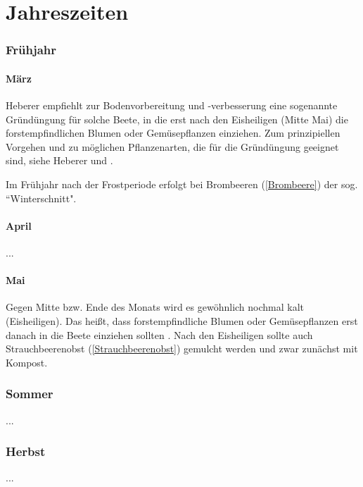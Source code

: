 \part{Jahreszeiten}

\section{Frühjahr}

\subsection{März}
\label{Mai}
Heberer \cite[S.~11]{Heberer2018} empfiehlt zur Bodenvorbereitung und -verbesserung eine sogenannte Gründüngung für solche Beete, in die erst nach den Eisheiligen (Mitte Mai) die forstempfindlichen Blumen oder Gemüsepflanzen einziehen.
Zum prinzipiellen Vorgehen und zu möglichen Pflanzenarten, die für die Gründüngung geeignet sind, siehe Heberer \cite[S.~11]{Heberer2018} und \cite[S.~114f]{Heberer2018}.

Im Frühjahr nach der Frostperiode erfolgt bei Brombeeren (\ref{Brombeere}) der sog. ``Winterschnitt".

\subsection{April}

...

\subsection{Mai}

Gegen Mitte bzw. Ende des Monats wird es gewöhnlich nochmal kalt (Eisheiligen).
Das heißt, dass forstempfindliche Blumen oder Gemüsepflanzen erst danach in die Beete einziehen sollten \cite[S.~11]{Heberer2018}.
Nach den Eisheiligen sollte auch \textrightarrow Strauchbeerenobst (\ref{Strauchbeerenobst}) gemulcht werden und zwar zunächst mit Kompost.

\section{Sommer}

...

\section{Herbst}

...

